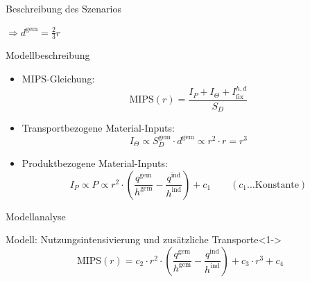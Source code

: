 \documentclass[beamer, xcolor={table,usenames,dvipsnames}]{beamer}
\begin{document}
\begin{frame}{Beschreibung des Szenarios}
\begin{minipage}[t]{0.38\textwidth}
{\begin{itemize}
                    $\Rightarrow d^\text{gem} = \frac{2}{3}r$
                \end{itemize}
            }
        \end{minipage}
    \end{frame}


    \begin{frame}{Modellbeschreibung}
        \begin{itemize}
            \item MIPS-Gleichung:
                $$\text{MIPS}(r) = \frac{I_P + I_\Theta + I_\text{fix}^{h,d}}{S_D}$$

            \item Transportbezogene Material-Inputs:
                $$I_\Theta \propto S_D^\text{gem} \cdot d^\text{gem} \propto r^2 \cdot r
                = r^3$$

            \item Produktbezogene Material-Inputs:
                $$ I_P \propto P \propto r^2 \cdot \left(
                \frac{q^\text{gem}}{h^\text{gem}} - \frac{q^\text{ind}}{h^\text{ind}}
                \right) + c_1 \qquad (c_1 \dots \text{Konstante})$$
        \end{itemize}
    \end{frame}

    \begin{frame}{Modellanalyse}
       	\begin{block}{Modell: Nutzungsintensivierung und zusätzliche Transporte}<1->
       		$$\text{MIPS}(r) = c_2 \cdot r^2 \cdot \left( \frac{q^\text{gem}}{h^\text{gem}} - \frac{q^\text{ind}}{h^\text{ind}} \right) + c_3 \cdot r^3 + c_4$$
       	\end{block}
    \end{frame}
\end{document}
